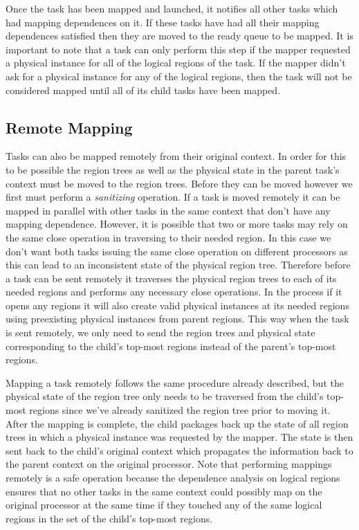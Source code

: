 Once the task has been mapped and launched, it notifies all other tasks which had mapping dependences on it.
If these tasks have had all their mapping dependences satisfied then they are moved to the ready queue to
be mapped.  It is important to note that a task can only perform this step if the mapper requested a physical
instance for all of the logical regions of the task.  If the mapper didn't ask for a physical instance for any
of the logical regions, then the task will not be considered mapped until all of its child tasks have been mapped.

\subsection{Remote Mapping}
Tasks can also be mapped remotely from their original context.  In order for this to be possible the region trees
as well as the physical state in the parent task's context must be moved to the region trees.  Before they can be
moved however we first must perform a {\em sanitizing} operation.  If a task is moved remotely it can be mapped
in parallel with other tasks in the same context that don't have any mapping dependence.  However, it is possible
that two or more tasks may rely on the same close operation in traversing to their needed region.  In this case
we don't want both tasks issuing the same close operation on different processors as this can lead to an
inconsistent state of the physical region tree.  Therefore before a task can be sent remotely it traverses the
physical region trees to each of its needed regions and performs any necessary close operations.  In the process
if it opens any regions it will also create valid physical instances at its needed regions using preexisting physical
instances from parent regions.  This way when the task is sent remotely, we only need to send the region trees
and physical state corresponding to the child's top-most regions instead of the parent's top-most regions.

Mapping a task remotely follows the same procedure already described, but the physical state of the region tree
only needs to be traversed from the child's top-most regions since we've already sanitized the region tree
prior to moving it.  After the mapping is complete, the child packages back up the state of all region trees
in which a physical instance was requested by the mapper.  The state is then sent back to the child's original
context which propagates the information back to the parent context on the original processor.  Note that performing
mappings remotely is a safe operation because the dependence analysis on logical regions ensures that no other
tasks in the same context could possibly map on the original processor at the same time if they touched any
of the same logical regions in the set of the child's top-most regions.

